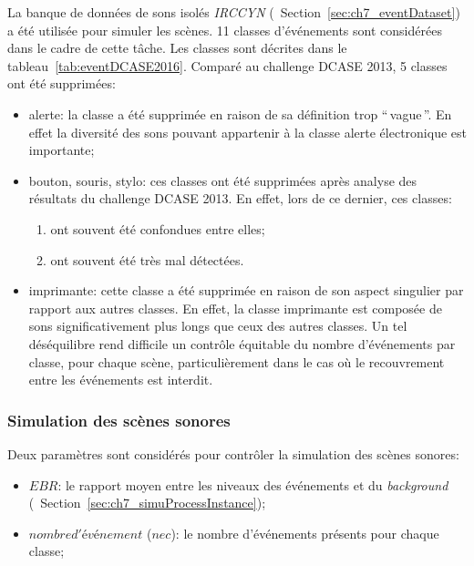 La banque de données de sons isolés \emph{IRCCYN} (\cf~Section~\ref{sec:ch7_eventDataset}) a été utilisée pour simuler les scènes. 11 classes d'événements sont considérées dans le cadre de cette tâche. Les classes sont décrites dans le tableau~\ref{tab:eventDCASE2016}. Comparé au challenge DCASE 2013, 5 classes ont été supprimées:

\begin{itemize}
\item alerte: la classe a été supprimée en raison de sa définition trop ``\,vague\,''. En effet la diversité des sons pouvant appartenir à la classe alerte électronique est importante;

\item bouton, souris, stylo: ces classes ont été supprimées après analyse des résultats du challenge DCASE 2013. En effet, lors de ce dernier, ces classes:

\begin{enumerate}
\item ont souvent été confondues entre elles;
\item ont souvent été très mal détectées. 
\end{enumerate}

\item imprimante: cette classe a été supprimée en raison de son aspect singulier par rapport aux autres classes. En effet, la classe imprimante est composée de sons significativement plus longs que ceux des autres classes. Un tel déséquilibre rend difficile un contrôle équitable du nombre d'événements par classe, pour chaque scène, particulièrement dans le cas où le recouvrement entre les événements est interdit.

\end{itemize}

\subsubsection{Simulation des scènes sonores}
\label{sec:ch7_simulationDcase2016}

Deux paramètres sont considérés pour contrôler la simulation des scènes sonores:

\begin{itemize}
\item $EBR$: le rapport moyen entre les niveaux des événements et du \emph{background} (\cf~Section~\ref{sec:ch7_simuProcessInstance});
\item $nombre d'événement$ ($nec$): le nombre d'événements présents pour chaque classe;
\end{itemize}

